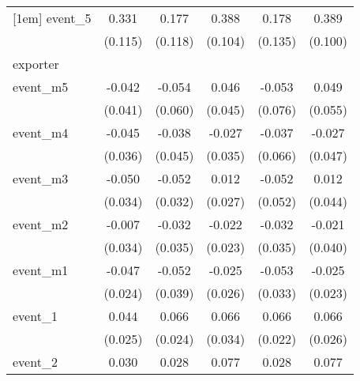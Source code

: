 {\begin{tabular}{l*{5}{c}}
[1em]
event\_5     &       0.331\sym{**} &       0.177         &       0.388\sym{***}&       0.178         &       0.389\sym{***}\\
            &     (0.115)         &     (0.118)         &     (0.104)         &     (0.135)         &     (0.100)         \\
\hline
exporter    &                     &                     &                     &                     &                     \\
event\_m5    &      -0.042         &      -0.054         &       0.046         &      -0.053         &       0.049         \\
            &     (0.041)         &     (0.060)         &     (0.045)         &     (0.076)         &     (0.055)         \\
[1em]
event\_m4    &      -0.045         &      -0.038         &      -0.027         &      -0.037         &      -0.027         \\
            &     (0.036)         &     (0.045)         &     (0.035)         &     (0.066)         &     (0.047)         \\
[1em]
event\_m3    &      -0.050         &      -0.052         &       0.012         &      -0.052         &       0.012         \\
            &     (0.034)         &     (0.032)         &     (0.027)         &     (0.052)         &     (0.044)         \\
[1em]
event\_m2    &      -0.007         &      -0.032         &      -0.022         &      -0.032         &      -0.021         \\
            &     (0.034)         &     (0.035)         &     (0.023)         &     (0.035)         &     (0.040)         \\
[1em]
event\_m1    &      -0.047         &      -0.052         &      -0.025         &      -0.053         &      -0.025         \\
            &     (0.024)         &     (0.039)         &     (0.026)         &     (0.033)         &     (0.023)         \\
[1em]
event\_1     &       0.044         &       0.066\sym{**} &       0.066\sym{*}  &       0.066\sym{**} &       0.066\sym{*}  \\
            &     (0.025)         &     (0.024)         &     (0.034)         &     (0.022)         &     (0.026)         \\
[1em]
event\_2     &       0.030         &       0.028         &       0.077\sym{*}  &       0.028         &       0.077\sym{*}  \\

\end{tabular}}
